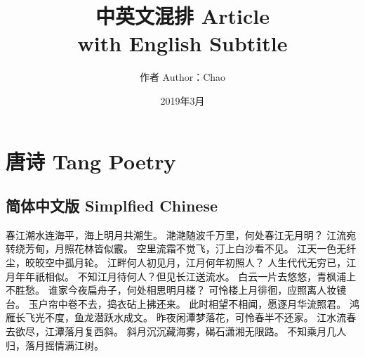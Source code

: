 \documentclass[a4paper]{article}
\title{
    中英文混排 Article \\
    \large with English Subtitle
}
\author{作者 Author：Chao}
\date{2019年3月}
\begin{document}
\maketitle
\tableofcontents
\newpage
\section{唐诗 Tang Poetry}
    \subsection{简体中文版 Simplfied Chinese}
        \begin{center}
            春江潮水连海平，海上明月共潮生。\newline
            滟滟随波千万里，何处春江无月明？\newline
            江流宛转绕芳甸，月照花林皆似霰。\newline
            空里流霜不觉飞，汀上白沙看不见。\newline
            江天一色无纤尘，皎皎空中孤月轮。\newline
            江畔何人初见月，江月何年初照人？\newline
            人生代代无穷已，江月年年祇相似。\newline
            不知江月待何人？但见长江送流水。\newline
            白云一片去悠悠，青枫浦上不胜愁。\newline
            谁家今夜扁舟子，何处相思明月楼？\newline
            可怜楼上月徘徊，应照离人妆镜台。\newline
            玉户帘中卷不去，捣衣砧上拂还来。\newline
            此时相望不相闻，愿逐月华流照君。\newline
            鸿雁长飞光不度，鱼龙潜跃水成文。\newline
            昨夜闲潭梦落花，可怜春半不还家。\newline
            江水流春去欲尽，江潭落月复西斜。\newline
            斜月沉沉藏海雾，碣石潇湘无限路。\newline
            不知乘月几人归，落月摇情满江树。\newline
        \end{center}
\end{document}
